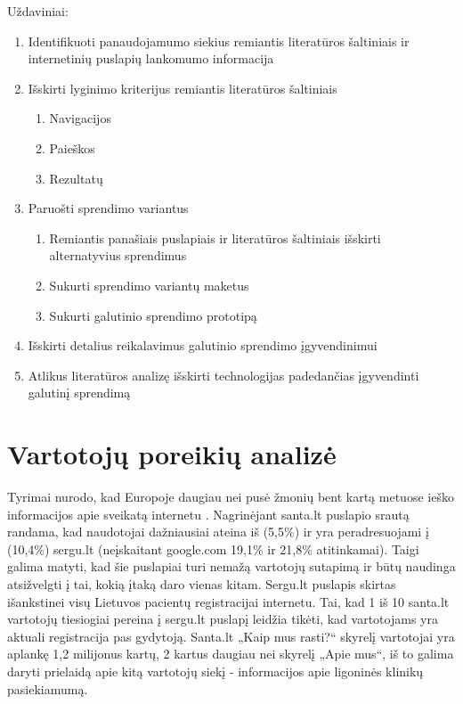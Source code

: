 \documentclass{VUMIFPSkursinis}
\begin{document}
Uždaviniai:
\begin{enumerate}
	\item Identifikuoti panaudojamumo siekius remiantis literatūros šaltiniais ir internetinių puslapių lankomumo informacija
	\item Išskirti lyginimo kriterijus remiantis literatūros šaltiniais
	\renewcommand*{\theenumii}{\theenumi.\arabic{enumii}}
	\renewcommand{\labelenumii}{\theenumii}
	\begin{enumerate}
		\item Navigacijos
		\item Paieškos
		\item Rezultatų
	\end{enumerate}
	\item Paruošti sprendimo variantus
	\begin{enumerate}
		\item Remiantis panašiais puslapiais ir literatūros šaltiniais išskirti alternatyvius sprendimus
		\item Sukurti sprendimo variantų maketus
		\item Sukurti galutinio sprendimo prototipą
	\end{enumerate}
	\item Išskirti detalius reikalavimus galutinio sprendimo įgyvendinimui
	\item Atlikus literatūros analizę išskirti technologijas padedančias įgyvendinti galutinį sprendimą
\end{enumerate}

\section{Vartotojų poreikių analizė}
Tyrimai nurodo, kad Europoje daugiau nei pusė žmonių bent kartą metuose ieško informacijos apie sveikatą internetu \cite{EuCitizDigHealthEn}. Nagrinėjant santa.lt puslapio srautą randama, kad naudotojai dažniausiai ateina iš (5,5\%) ir yra peradresuojami į (10,4\%) sergu.lt (neįskaitant google.com 19,1\% ir 21,8\% atitinkamai)\cite{AlexaSantaEn}. Taigi galima matyti, kad šie puslapiai turi nemažą vartotojų sutapimą ir būtų naudinga atsižvelgti į tai, kokią įtaką daro vienas kitam. Sergu.lt puslapis skirtas išankstinei visų Lietuvos pacientų registracijai internetu. Tai, kad 1 iš 10 santa.lt vartotojų tiesiogiai pereina į sergu.lt puslapį leidžia tikėti, kad vartotojams yra aktuali registracija pas gydytoją. Santa.lt „Kaip mus rasti?“ skyrelį vartotojai yra aplankę 1,2 milijonus kartų\cite{VulSkKaipMusRastiLt}, 2 kartus daugiau nei skyrelį „Apie mus“\cite{VulSkApieMusLt}, iš to galima daryti prielaidą apie kitą vartotojų siekį - informacijos apie ligoninės klinikų pasiekiamumą.
\vspace{0,5cm}
\end{document}
